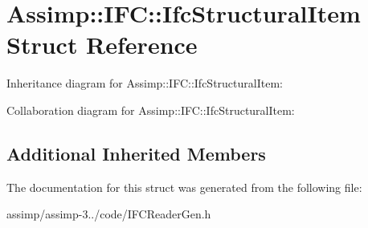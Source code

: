 \hypertarget{struct_assimp_1_1_i_f_c_1_1_ifc_structural_item}{\section{Assimp\+:\+:I\+F\+C\+:\+:Ifc\+Structural\+Item Struct Reference}
\label{struct_assimp_1_1_i_f_c_1_1_ifc_structural_item}
}


Inheritance diagram for Assimp\+:\+:I\+F\+C\+:\+:Ifc\+Structural\+Item\+:


Collaboration diagram for Assimp\+:\+:I\+F\+C\+:\+:Ifc\+Structural\+Item\+:
\subsection*{Additional Inherited Members}


The documentation for this struct was generated from the following file\+:\begin{DoxyCompactItemize}
\item 
assimp/assimp-\/3../code/I\+F\+C\+Reader\+Gen.\+h\end{DoxyCompactItemize}
